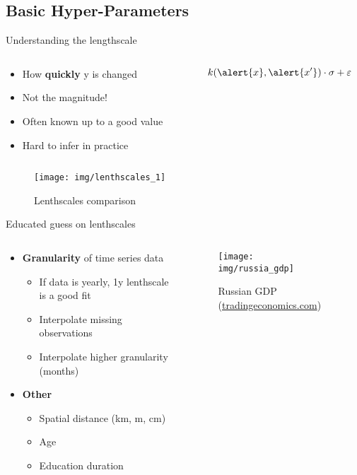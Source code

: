 \documentclass{beamer}
\begin{document}
\subsection{Basic Hyper-Parameters}
\begin{frame}{Understanding the lengthscale}
\begin{columns}
    \begin{column}{0.5\linewidth}
        \begin{itemize}
        \item How \textbf{quickly} y is changed
        \item Not the magnitude!
        \item Often known up to a good value
        \item Hard to infer in practice
    \end{itemize}
    \end{column}
    \begin{column}{0.5\linewidth}
        \begin{equation*}
            k(\alert{x}, \alert{x'}) \cdot \sigma + \varepsilon 
        \end{equation*}
    \end{column}
\end{columns}
    \begin{figure}
        \centering
        \texttt{[image: img/lenthscales\_1]}
        \caption{Lenthscales comparison}
    \end{figure}
\end{frame}
\begin{frame}{Educated guess on lenthscales}
\begin{columns}
\begin{column}{0.5\linewidth}
\begin{itemize}
    \item<1-> \textbf{Granularity} of time series data
    \begin{itemize}
        \item If data is yearly, 1y lenthscale is a good fit
        \item Interpolate missing observations
        \item Interpolate higher granularity (months)
    \end{itemize}
    \item<2-> \textbf{Other}
    \begin{itemize}
        \item Spatial distance (km, m, cm)
        \item Age
        \item Education duration
    \end{itemize}
\end{itemize}    
\end{column}
\begin{column}{0.5\linewidth}
    \begin{figure}
        \centering
        \texttt{[image: img/russia\_gdp]}
        \caption{Russian GDP (\href{https://tradingeconomics.com/russia/gdp}{tradingeconomics.com})}
    \end{figure}    
\end{column}
\end{columns}
\end{frame}
\end{document}
